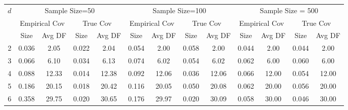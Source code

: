\documentclass[12pt]{article}
\numberwithin{equation}{section}
\numberwithin{table}{section}
\numberwithin{thm}{section}
\numberwithin{defn}{section}
\numberwithin{lem}{section}
\numberwithin{prop}{section}
\numberwithin{cor}{section}
\numberwithin{rem}{section}
\begin{document}
\begin{appendix}
\begin{sidewaystable}[htbp]
\centering
  \small
\begin{tabular}{|c|cccc|cccc|cccc|}
\hline
\multirow{3}{*}{$d$} & \multicolumn{4}{c|}{Sample Size=50} & \multicolumn{4}{c|}{Sample Size=100} & \multicolumn{4}{c|}{Sample Size = 500} \\ \cline{2-13} 
 & \multicolumn{2}{c|}{Empirical Cov} & \multicolumn{2}{c|}{True Cov} & \multicolumn{2}{c|}{Empirical Cov} & \multicolumn{2}{c|}{True Cov} & \multicolumn{2}{c|}{Empirical Cov} & \multicolumn{2}{c|}{True Cov} \\ \cline{2-13} 
 & \multicolumn{1}{c|}{Size} & \multicolumn{1}{c|}{Avg DF} & \multicolumn{1}{c|}{Size} & Avg DF & \multicolumn{1}{c|}{Size} & \multicolumn{1}{c|}{Avg DF} & \multicolumn{1}{c|}{Size} & Avg DF & \multicolumn{1}{c|}{Size} & \multicolumn{1}{c|}{Avg DF} & \multicolumn{1}{c|}{Size} & Avg DF \\ \hline
2 & \multicolumn{1}{c|}{0.036} & \multicolumn{1}{c|}{2.05} & \multicolumn{1}{c|}{0.022} & 2.04 & \multicolumn{1}{c|}{0.054} & \multicolumn{1}{c|}{2.00} & \multicolumn{1}{c|}{0.058} & 2.00 & \multicolumn{1}{c|}{0.044} & \multicolumn{1}{c|}{2.00} & \multicolumn{1}{c|}{0.044} & 2.00 \\ \hline
3 & \multicolumn{1}{c|}{0.066} & \multicolumn{1}{c|}{6.10} & \multicolumn{1}{c|}{0.034} & 6.13 & \multicolumn{1}{c|}{0.074} & \multicolumn{1}{c|}{6.02} & \multicolumn{1}{c|}{0.054} & 6.02 & \multicolumn{1}{c|}{0.062} & \multicolumn{1}{c|}{6.00} & \multicolumn{1}{c|}{0.060} & 6.00 \\ \hline
4 & \multicolumn{1}{c|}{0.088} & \multicolumn{1}{c|}{12.33} & \multicolumn{1}{c|}{0.014} & 12.38 & \multicolumn{1}{c|}{0.092} & \multicolumn{1}{c|}{12.06} & \multicolumn{1}{c|}{0.036} & 12.06 & \multicolumn{1}{c|}{0.066} & \multicolumn{1}{c|}{12.00} & \multicolumn{1}{c|}{0.054} & 12.00 \\ \hline
5 & \multicolumn{1}{c|}{0.186} & \multicolumn{1}{c|}{20.15} & \multicolumn{1}{c|}{0.018} & 20.42 & \multicolumn{1}{c|}{0.116} & \multicolumn{1}{c|}{20.05} & \multicolumn{1}{c|}{0.050} & 20.08 & \multicolumn{1}{c|}{0.062} & \multicolumn{1}{c|}{20.00} & \multicolumn{1}{c|}{0.056} & 20.00 \\ \hline
6 & \multicolumn{1}{c|}{0.358} & \multicolumn{1}{c|}{29.75} & \multicolumn{1}{c|}{0.020} & 30.65 & \multicolumn{1}{c|}{0.176} & \multicolumn{1}{c|}{29.97} & \multicolumn{1}{c|}{0.020} & 30.09 & \multicolumn{1}{c|}{0.058} & \multicolumn{1}{c|}{30.00} & \multicolumn{1}{c|}{0.046} & 30.00 \\ \hline

\end{tabular}
\end{sidewaystable}
\end{appendix}
\end{document}
